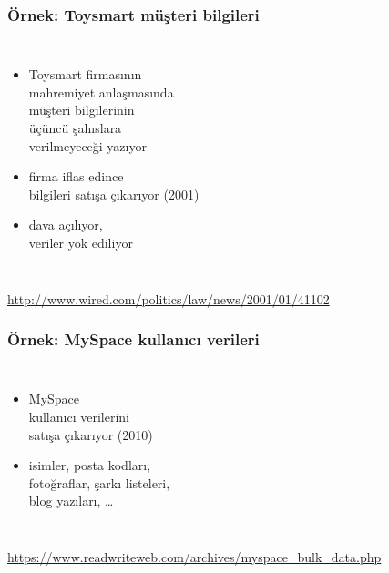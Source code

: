 \documentclass[dvipsnames]{beamer}
\theoremstyle{definition}
\theoremstyle{example}
\theoremstyle{plain}
\begin{document}
\begin{frame}
  \frametitle{Örnek: Toysmart müşteri bilgileri}

  \begin{columns}

    \begin{itemize}
      \item Toysmart firmasının\\
        mahremiyet anlaşmasında\\
        müşteri bilgilerinin\\
        üçüncü şahıslara\\
        verilmeyeceği yazıyor
      \item firma iflas edince\\bilgileri satışa çıkarıyor (2001)
      \item dava açılıyor,\\
        veriler yok ediliyor
    \end{itemize}
  \end{columns}

  \medskip
  \tiny{\url{http://www.wired.com/politics/law/news/2001/01/41102}}\\
\end{frame}

\begin{frame}
  \frametitle{Örnek: MySpace kullanıcı verileri}

  \begin{columns}

    \begin{itemize}
      \item MySpace\\
        kullanıcı verilerini\\
        satışa çıkarıyor (2010)
      \item isimler, posta kodları,\\
        fotoğraflar, şarkı listeleri,\\
        blog yazıları, \ldots
    \end{itemize}
  \end{columns}

  \medskip
  \tiny{\url{https://www.readwriteweb.com/archives/myspace_bulk_data.php}}\\
\end{frame}
\end{document}
